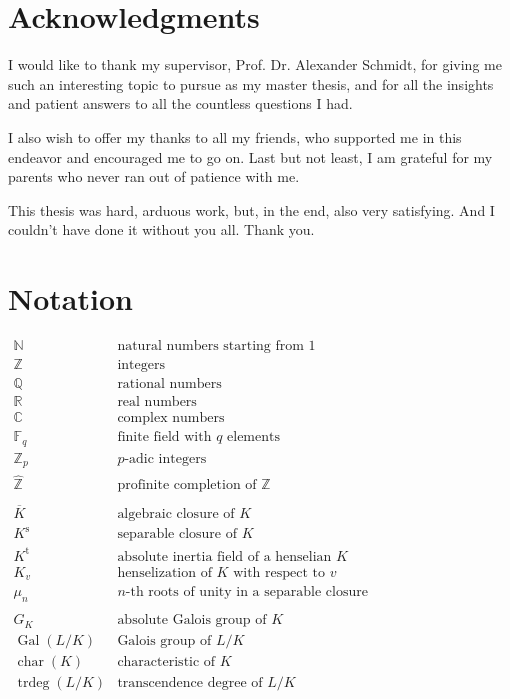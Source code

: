 \section{Acknowledgments}

I would like to thank my supervisor, Prof. Dr. Alexander Schmidt, for giving me such an interesting topic to pursue as my master thesis, and for all the insights and patient answers to all the countless questions I had. 

I also wish to offer my thanks to all my friends, who supported me in this endeavor and encouraged me to go on. Last but not least, I am grateful for my parents who never ran out of patience with me. 

This thesis was hard, arduous work, but, in the end, also very satisfying. And I couldn't have done it without you all. Thank you.

\clearpage

\section{Notation}

$\begin{array}{ll}
\mathbb{N} & \text{natural numbers starting from $1$} \\
\mathbb{Z} & \text{integers}\\
\mathbb{Q} & \text{rational numbers}\\
\mathbb{R} & \text{real numbers}\\
\mathbb{C} & \text{complex numbers}\\
\mathbb{F}_q & \text{finite field with $q$ elements}\\
\mathbb{Z}_p & \text{$p$-adic integers}\\
\widehat{\mathbb{Z}} & \text{profinite completion of $\mathbb{Z}$}\\
\\
\overline{K} & \text{algebraic closure of $K$}\\
K^\text{s} & \text{separable closure of $K$}\\
K^\text{t} & \text{absolute inertia field of a henselian $K$}\\
K_v & \text{henselization of $K$ with respect to $v$}\\
\mu_n & \text{$n$-th roots of unity in a separable closure}\\
\\
G_K & \text{absolute Galois group of $K$}\\
\operatorname{Gal}(L/K) & \text{Galois group of $L/K$}\\
\operatorname{char}(K) & \text{characteristic of $K$}\\
\operatorname{trdeg}(L/K) & \text{transcendence degree of $L/K$}\\
\end{array}$
